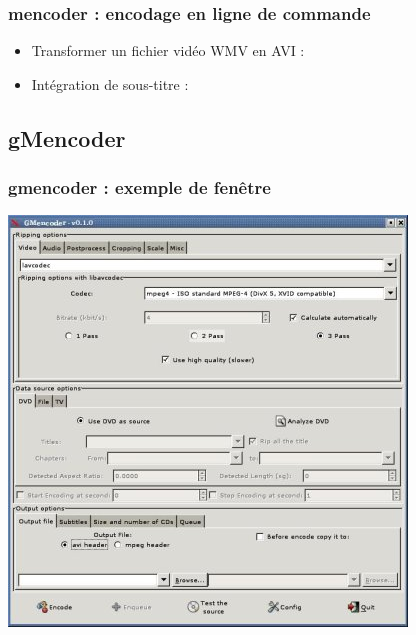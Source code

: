 \begin{frame}
\frametitle{\textbf{mencoder} : encodage en ligne de commande}
\begin{itemize}
\item Transformer un fichier vidéo WMV en AVI :


\item Intégration de sous-titre :

\end{itemize}
\end{frame}

\subsection{gMencoder}
\begin{frame}
\frametitle{gmencoder : exemple de fenêtre}
\includegraphics[scale=0.40]{ressources/gmencoder.jpg}
\end{frame}

